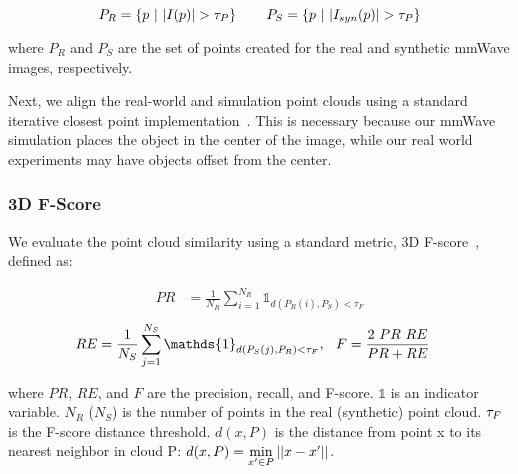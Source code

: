     \vspace{-0.1in}
    {\eqsize
    \begin{equation}
        P_R = \{ p\ |\  |I(p)| > \tau_P \} \hspace{0.3in} P_S = \{ p\ |\  |I_{syn}(p)| > \tau_P \} \notag
    \end{equation}
    }

    \noindent where $P_R$ and $P_S$ are the set of points created for the real and synthetic mmWave images, respectively. 

Next, we align the real-world and simulation point clouds using a standard iterative closest point implementation~\cite{icp}. This is necessary because our mmWave simulation places the object in the center of the image, while our real world experiments may have objects offset from the center. 
    

\vspace{-0.1pt}
\subsubsection{3D F-Score}
\vspace{-0.1pt}

We evaluate the point cloud similarity using a standard metric, 3D F-score~\cite{3d_fscore}, defined as:
    
\vspace{-0.05in}
{\eqsize
\begin{equation}
\begin{aligned}
    PR &= \frac{1}{N_R} \sum_{i=1}^{N_R} \mathds{1}_{d(P_{R}(i),P_{S})<\tau_F}
\end{aligned}
\end{equation}
}
\vspace{-0.05in}
{\eqsize
\begin{equation}
\begin{aligned}
    RE &= \frac{1}{N_{S}} \sum_{j=1}^{N_{S}} \mathds{1}_{d(P_S(j),P_{R})<\tau_F}, \hspace{0.1in}
    F = \frac{2\ PR \ RE}{PR+RE}  
\end{aligned}
\end{equation}
}
\vspace{-0.05in}

\noindent where $PR$, $RE$, and $F$ are the precision, recall, and F-score. $\mathds{1}$ is an indicator variable. $N_R$ ($N_S$) is the number of points in the real (synthetic) point cloud. ${\small \tau_F}$ is the F-score distance threshold. $d(x, P)$ is the distance from point x to its nearest neighbor in cloud P: ${\footnotesize d(x, P) = \min\limits_{x'\in P} ||x-x'||}$.  


